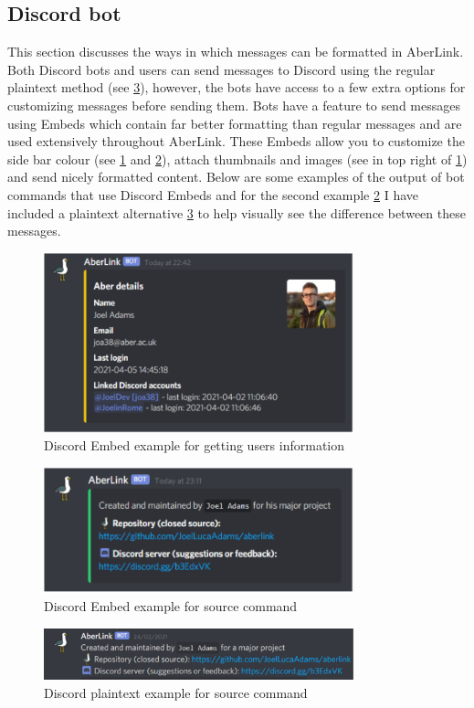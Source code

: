 \subsection{Discord bot}
This section discusses the ways in which messages can be formatted in AberLink. Both Discord bots and users can send messages to Discord using the regular plaintext method (see \ref{fig:dis-source-old}), however, the bots have access to a few extra options for customizing messages before sending them. Bots have a feature to send messages using Embeds which contain far better formatting than regular messages and are used extensively throughout AberLink. These Embeds allow you to customize the side bar colour (see \ref{fig:dis-go} and \ref{fig:dis-source}), attach thumbnails and images (see in top right of \ref{fig:dis-go}) and send nicely formatted content. Below are some examples of the output of bot commands that use Discord Embeds and for the second example \ref{fig:dis-source} I have included a plaintext alternative \ref{fig:dis-source-old} to help visually see the difference between these messages.
\begin{figure}[H]
	\centering
	\includegraphics[width=0.8\textwidth]{Figures/test-2}
	\caption{Discord Embed example for getting users information}
	\label{fig:dis-go}
\end{figure}
\begin{figure}[H]
	\centering
	\includegraphics[width=0.8\textwidth]{Figures/test}
	\caption{Discord Embed example for source command}
	\label{fig:dis-source}
\end{figure}
\begin{figure}[H]
	\centering
	\includegraphics[width=0.8\textwidth]{Figures/discord-cmd-old-src.pdf}
	\caption{Discord plaintext example for source command}
	\label{fig:dis-source-old}
\end{figure}

